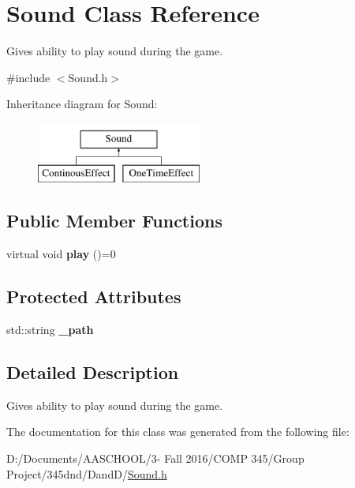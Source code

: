 \hypertarget{class_sound}{}\section{Sound Class Reference}
\label{class_sound}


Gives ability to play sound during the game.  




{\ttfamily \#include $<$Sound.\+h$>$}

Inheritance diagram for Sound\+:\begin{figure}[H]
\begin{center}
\leavevmode
\includegraphics[height=2.000000cm]{class_sound}
\end{center}
\end{figure}
\subsection*{Public Member Functions}
\begin{DoxyCompactItemize}
\item 
\hypertarget{class_sound_ac21fbfba72c642a1a435ffebaa163f80}{}\label{class_sound_ac21fbfba72c642a1a435ffebaa163f80} 
virtual void {\bfseries play} ()=0
\end{DoxyCompactItemize}
\subsection*{Protected Attributes}
\begin{DoxyCompactItemize}
\item 
\hypertarget{class_sound_aadd87ac34e49d9c34b4dbf6876858965}{}\label{class_sound_aadd87ac34e49d9c34b4dbf6876858965} 
std\+::string {\bfseries \+\_\+path}
\end{DoxyCompactItemize}


\subsection{Detailed Description}
Gives ability to play sound during the game. 

The documentation for this class was generated from the following file\+:\begin{DoxyCompactItemize}
\item 
D\+:/\+Documents/\+A\+A\+S\+C\+H\+O\+O\+L/3-\/ Fall 2016/\+C\+O\+M\+P 345/\+Group Project/345dnd/\+Dand\+D/\hyperlink{_sound_8h}{Sound.\+h}\end{DoxyCompactItemize}
